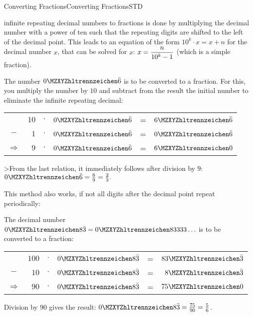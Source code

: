 \begin{MXContent}{Converting Fractions}{Converting Fractions}{STD}
\begin{MInfo}
 infinite repeating decimal numbers to fractions is 
done by multiplying the decimal number with a power of ten such that the repeating digits are shifted 
to the left of the decimal point. This leads to an equation of the form $10^k\cdot x=x+n$ for the decimal 
number $x$, that can be solved for $x$: $x=\dfrac{n}{10^k-1}$ (which is a simple fraction).
\end{MInfo}

\begin{MExample}
The number $\MZahl{0}{}\bar 6$ is to be converted to a fraction. For this, you multiply the number by 
$10$ and subtract from the result the initial number to eliminate the infinite repeating decimal:
\begin{center}
\begin{tabular}{crclcr}
	&$10$ & $\cdot$ & $\MZahl{0}{}\bar 6$ & = & $\MZahl{6}{}\bar 6$\\
	$-$ & $1$ & $\cdot$ & $\MZahl{0}{}\bar 6$ & = & $\MZahl{0}{}\bar 6$\\
\hline
$\Rightarrow$&$9$ & $\cdot$ & $\MZahl{0}{}\bar 6$ & = & $\MZahl{6}{0}$\\
\end{tabular}
\end{center}
>From the last relation, it immediately follows after division by $9$:
\quad $\displaystyle \MZahl{0}{}\bar 6 = \Mtfrac{6}{9} = \Mtfrac{2}{3}.$
\end{MExample}

This method also works, if not all digits after the decimal point repeat periodically:

\begin{MExample}
The decimal number $\MZahl{0}{8}\bar{3}=\MZahl{0}{83333}\ldots$ is to be converted to 
a fraction:
\begin{center}
\begin{tabular}{crclcr}
&$100$ & $\cdot$ & $\MZahl{0}{8}\bar 3$ & = & $\MZahl{83}{}\bar 3$\\
$-$&$10$ & $\cdot$ & $\MZahl{0}{8}\bar 3$ & = & $\MZahl{8}{}\bar 3$\\
\hline
$\Rightarrow$&$90$ & $\cdot$ & $\MZahl{0}{8}\bar 3$ & = & $\MZahl{75}{0}$\\
\end{tabular}
\end{center}
Division by $90$ gives the result: $\displaystyle \MZahl{0}{8}\bar 3 = \Mtfrac{75}{90} = \Mtfrac{5}{6}$.
\end{MExample}


\end{MXContent}
